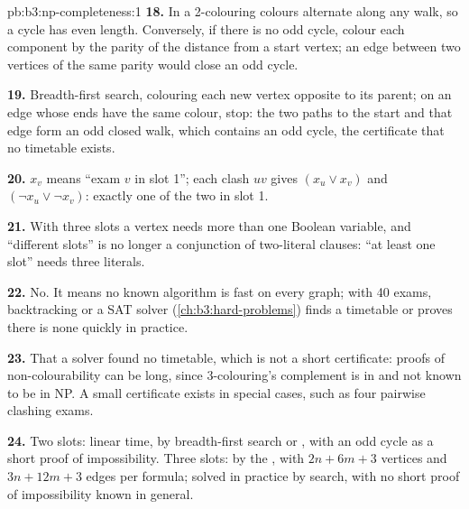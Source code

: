 \begin{solution}{pb:b3:np-completeness:1}
\textbf{18.} In a 2-colouring colours alternate along any walk, so a cycle has even length. Conversely, if there is no odd cycle, colour each component by the parity of the distance from a start vertex; an edge between two vertices of the same parity would close an odd cycle.

\textbf{19.} Breadth-first search, colouring each new vertex opposite to its parent; on an edge whose ends have the same colour, stop: the two paths to the start and that edge form an odd closed walk, which contains an odd cycle, the certificate that no timetable exists.

\textbf{20.} $x_v$ means ``exam $v$ in slot 1''; each clash $uv$ gives $(x_u \vee x_v)$ and $(\neg x_u \vee \neg x_v)$: exactly one of the two in slot 1.

\textbf{21.} With three slots a vertex needs more than one Boolean variable, and ``different slots'' is no longer a conjunction of two-literal clauses: ``at least one slot'' needs three literals.

\textbf{22.} No. It means no known algorithm is fast on every graph; with 40 exams, backtracking or a SAT solver (\cref{ch:b3:hard-problems}) finds a timetable or proves there is none quickly in practice.

\textbf{23.} That a solver found no timetable, which is not a short certificate: proofs of non-colourability can be long, since 3-colouring's complement is in  and not known to be in NP. A small certificate exists in special cases, such as four pairwise clashing exams.

\textbf{24.} Two slots: linear time, by breadth-first search or , with an odd cycle as a short proof of impossibility. Three slots:  by the , with $2n + 6m + 3$ vertices and $3n + 12m + 3$ edges per formula; solved in practice by search, with no short proof of impossibility known in general.
\end{solution}
